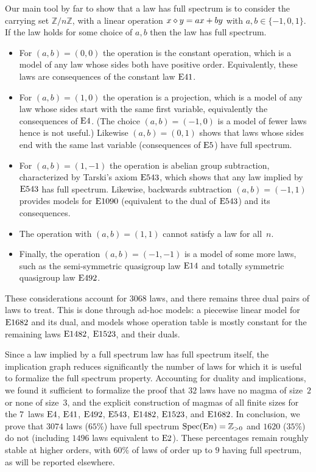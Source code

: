 Our main tool by far to show that a law has full spectrum is to consider the carrying set $\mathbb{Z}/n\mathbb{Z}$, with a linear operation $x\diamond y = ax+by$ with $a,b\in\{-1,0,1\}$.  If the law holds for some choice of $a,b$ then the law has full spectrum.
\begin{itemize}
\item For $(a,b)=(0,0)$ the operation is the constant operation, which is a model of any law whose sides both have positive order.  Equivalently, these laws are consequences of the constant law $\mathrm{E}41$.
\item For $(a,b)=(1,0)$ the operation is a projection, which is a model of any law whose sides start with the same first variable, equivalently the consequences of $\mathrm{E}4$.  (The choice $(a,b)=(-1,0)$ is a model of fewer laws hence is not useful.)  Likewise $(a,b)=(0,1)$ shows that laws whose sides end with the same last variable (consequences of $\mathrm{E}5$) have full spectrum.
\item For $(a,b)=(1,-1)$ the operation is abelian group subtraction, characterized by Tarski's axiom $\mathrm{E}543$, which shows that any law implied by $\mathrm{E}543$ has full spectrum.  Likewise, backwards subtraction $(a,b)=(-1,1)$ provides models for $\mathrm{E}1090$ (equivalent to the dual of $\mathrm{E}543$) and its consequences.
\item The operation with $(a,b)=(1,1)$ cannot satisfy a law for all~$n$.
\item Finally, the operation $(a,b)=(-1,-1)$ is a model of some more laws, such as the semi-symmetric quasigroup law $\mathrm{E}14$ and totally symmetric quasigroup law $\mathrm{E}492$.
\end{itemize}
These considerations account for $\num{3068}$ laws, and there remains three dual pairs of laws to treat.  This is done through ad-hoc models: a piecewise linear model for $\mathrm{E}1682$ and its dual, and models whose operation table is mostly constant for the remaining laws $\mathrm{E}1482$, $\mathrm{E}1523$, and their duals.

Since a law implied by a full spectrum law has full spectrum itself, the implication graph reduces significantly the number of laws for which it is useful to formalize the full spectrum property.  Accounting for duality and implications, we found it sufficient to formalize the proof that $32$ laws have no magma of size~$2$ or none of size~$3$, and the explicit construction of magmas of all finite sizes for the $7$~laws $\mathrm{E}4$, $\mathrm{E}41$, $\mathrm{E}492$, $\mathrm{E}543$, $\mathrm{E}1482$, $\mathrm{E}1523$, and $\mathrm{E}1682$.  In conclusion, we prove that $\num{3074}$ laws ($65\%$) have full spectrum $\operatorname{Spec}(\mathrm{E}n)=\mathbb{Z}_{>0}$ and $\num{1620}$ ($35\%$) do not (including $\num{1496}$ laws equivalent to $\mathrm{E}2$).  These percentages remain roughly stable at higher orders, with $60\%$ of laws of order up to $9$ having full spectrum, as will be reported elsewhere.

